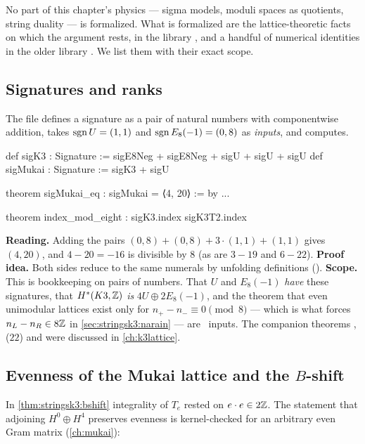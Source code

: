 No part of this chapter's physics --- sigma models, moduli spaces as quotients, string
duality --- is formalized. What is formalized are the lattice-theoretic facts on which the
argument rests, in the library , and a handful of numerical
identities in the older library . We list them with their exact
scope.

\subsection{Signatures and ranks}
The file  defines a signature as a pair of
natural numbers with componentwise addition, takes $\operatorname{sgn} U=(1,1)$ and
$\operatorname{sgn} E_8(-1)=(0,8)$ as \emph{inputs}, and computes.

\begin{leanbox}[In Lean: $(3,19)+(1,1)=(4,20)$ and the mod-8 condition]
\begin{leancode}
def sigK3 : Signature := sigE8Neg + sigE8Neg + sigU + sigU + sigU
def sigMukai : Signature := sigK3 + sigU

theorem sigMukai_eq : sigMukai = ⟨4, 20⟩ := by ...

theorem index_mod_eight :
    sigK3.index %
    sigK3T2.index %
\end{leancode}
\textbf{Reading.} Adding the pairs $(0,8)+(0,8)+3\cdot(1,1)+(1,1)$ gives $(4,20)$, and
$4-20=-16$ is divisible by $8$ (as are $3-19$ and $6-22$). \textbf{Proof idea.} Both sides
reduce to the same numerals by unfolding definitions (). \textbf{Scope.} This is
bookkeeping on pairs of numbers. That $U$ and $E_8(-1)$ \emph{have} these signatures, that
$H^*(K3,\mathbb{Z})$ \emph{is} $4U\oplus2E_8(-1)$, and the theorem that even unimodular lattices exist
only for $n_+-n_-\equiv0\pmod 8$ --- which is what forces $n_L-n_R\in8\mathbb{Z}$ in
\cref{sec:stringsk3:narain} --- are \TL\ inputs. The companion theorems ,
 ($22$) and  were discussed in \cref{ch:k3lattice}.
\end{leanbox}

\subsection{Evenness of the Mukai lattice and the \texorpdfstring{$B$}{B}-shift}
In \cref{thm:stringsk3:bshift} integrality of $T_e$ rested on $e\cdot e\in2\mathbb{Z}$. The statement
that adjoining $H^0\oplus H^4$ preserves evenness is kernel-checked for an arbitrary even Gram
matrix (\cref{ch:mukai}):


